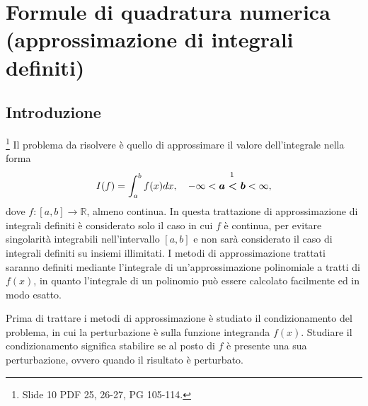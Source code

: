 \section{Formule di quadratura numerica (approssimazione di integrali definiti)}
\subsection{Introduzione}
\footnote{Slide 10 PDF 25, 26-27, PG 105-114.} Il problema da risolvere è quello di approssimare il valore dell'integrale nella forma
\begin{equation}\label{eq:problema_quadratura}
    I(f)=\int_{a}^{b}f(x) dx,\quad -\infty<\overset{\footnotemark}{\boldsymbol{a<b}}<\infty ,
\end{equation}
dove $f:[a,b]\rightarrow\mathbb R$, almeno continua. In questa trattazione di approssimazione di integrali definiti è considerato solo il caso in cui $f$ è continua, per evitare singolarità integrabili nell'intervallo $[a,b]$ e non sarà considerato il caso di integrali definiti su insiemi illimitati. I metodi di approssimazione trattati saranno definiti mediante l'integrale di un'approssimazione polinomiale a tratti di $f(x)$, in quanto l'integrale di un polinomio può essere calcolato facilmente ed in modo esatto.

Prima di trattare i metodi di approssimazione è studiato il condizionamento del problema, in cui la perturbazione è sulla funzione integranda $f(x)$. Studiare il condizionamento significa stabilire se al posto di $f$ è presente una sua perturbazione, ovvero quando il risultato è perturbato.

